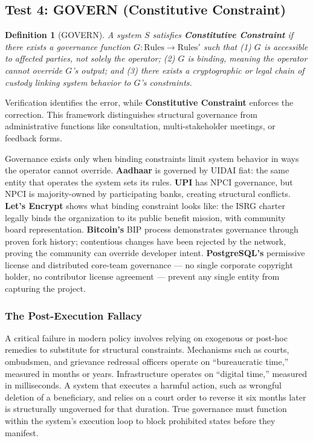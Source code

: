 \documentclass{article}
\newtheorem{definition}{Definition}[section]
\begin{document}
\subsection{Test 4: GOVERN (Constitutive Constraint)}

\begin{definition}[GOVERN]
\label{def:govern}
A system $S$ satisfies \textbf{Constitutive Constraint} if there exists a governance function $G: \text{Rules} \to \text{Rules}'$ such that (1) $G$ is accessible to affected parties, not solely the operator; (2) $G$ is binding, meaning the operator cannot override $G$'s output; and (3) there exists a cryptographic or legal chain of custody linking system behavior to $G$'s constraints.
\end{definition}

Verification identifies the error, while \textbf{Constitutive Constraint} enforces the correction. This framework distinguishes structural governance from administrative functions like consultation, multi-stakeholder meetings, or feedback forms.

Governance exists only when binding constraints limit system behavior in ways the operator cannot override. \textbf{Aadhaar} is governed by UIDAI fiat: the same entity that operates the system sets its rules. \textbf{UPI} has NPCI governance, but NPCI is majority-owned by participating banks, creating structural conflicts. \textbf{Let's Encrypt} shows what binding constraint looks like: the ISRG charter legally binds the organization to its public benefit mission, with community board representation. \textbf{Bitcoin's} BIP process demonstrates governance through proven fork history; contentious changes have been rejected by the network, proving the community can override developer intent. \textbf{PostgreSQL's} permissive license and distributed core-team governance --- no single corporate copyright holder, no contributor license agreement --- prevent any single entity from capturing the project.

\subsubsection{The Post-Execution Fallacy}
\label{subsec:post-execution}
A critical failure in modern policy involves relying on exogenous or post-hoc remedies to substitute for structural constraints. Mechanisms such as courts, ombudsmen, and grievance redressal officers operate on ``bureaucratic time,'' measured in months or years. Infrastructure operates on ``digital time,'' measured in milliseconds. A system that executes a harmful action, such as wrongful deletion of a beneficiary, and relies on a court order to reverse it six months later is structurally ungoverned for that duration. True governance must function within the system's execution loop to block prohibited states before they manifest.
\end{document}
